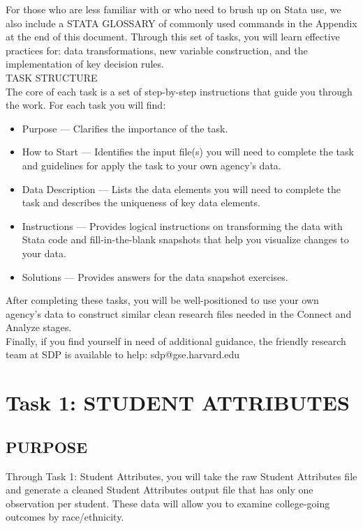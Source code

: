 \documentclass[12pt]{article}
\begin{document}
For those who are less familiar with or who need to brush up on Stata use, we also include a STATA GLOSSARY of 
commonly used commands in the Appendix at the end of this document.  Through this set of tasks, you will learn effective practices 
for: data transformations, new variable construction, and the implementation of key decision rules.\\

\Large{TASK STRUCTURE} \\
\normalsize
The core of each task is a set of step-by-step instructions that guide you through the work. For each task you will find:
\begin{itemize}
\item Purpose --- Clarifies the importance of the task.  
\item How to Start --- Identifies the input file(s) you will need to complete the task and guidelines for apply the task to your  own agency's data.
\item Data Description --- Lists the data elements you will need to complete the task and describes the uniqueness of key data elements.
\item Instructions --- Provides logical instructions on transforming the data with Stata code and fill-in-the-blank snapshots that help you visualize changes to your data.
\item Solutions --- Provides answers for the data snapshot exercises.
\end{itemize}

After completing these tasks, you will be well-positioned to use your own agency’s data to construct similar clean research files needed in the Connect and Analyze stages.\\

Finally, if you find yourself in need of additional guidance, the friendly research team at SDP is available to help: sdp@gse.harvard.edu


\section{Task 1: STUDENT ATTRIBUTES}
\subsection{PURPOSE}

\normalsize Through Task 1: Student Attributes, you will take the raw Student Attributes file and generate a cleaned Student Attributes output 
file that has only one observation per student. These data will allow you to examine college-going outcomes by race/ethnicity.\\
\end{document}
